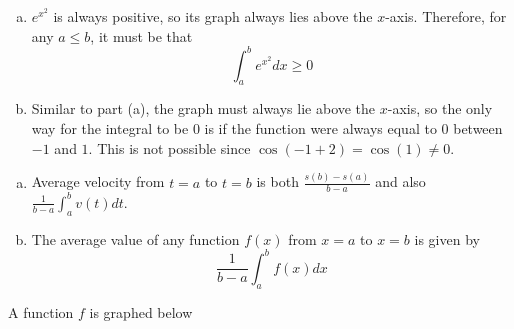 \documentclass[11pt]{exam}
\begin{document}
\begin{questions}
\begin{solution}
   \begin{enumerate}[(a)]
   \item \(e^{x^2}\) is always positive, so its graph always lies
     above the \(x\)-axis. Therefore, for any \(a \leq b\), it must be
     that \[
       \int_a^b e^{x^2} dx \geq 0
     \]
   \item Similar to part (a), the graph must always lie above the
     \(x\)-axis, so the only way for the integral to be \(0\) is if
     the function were always equal to 0 between \(-1\) and \(1\). 
     This is not possible since \(\cos(-1+2) = \cos(1) \neq
     0\).
   \end{enumerate}
 \end{solution}
\question
  \begin{solution}
    \begin{enumerate}[(a)]
    \item Average velocity from \(t=a\) to \(t=b\) is both
      \(\frac{s(b)-s(a)}{b-a}\) and also
      \(\frac{1}{b-a} \int_a^b v(t) dt\).
    \item The average value of any function \(f(x)\) from \(x=a\) to
      \(x=b\) is given by \[
        \frac{1}{b-a} \int_a^b f(x) dx
      \]
    \end{enumerate}
  \end{solution}
  \question A function \(f\) is graphed below
    \begin{multicols}{2}
\end{multicols}
\end{questions}
\end{document}

